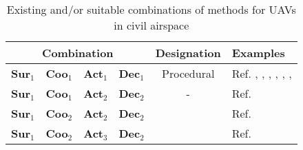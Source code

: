 \begin{table}[h]
 \begin{center}
   \caption{Existing and/or suitable combinations of methods for UAVs in civil airspace }
   \begin{tabular}{lccccl}
   \hline  \multicolumn{4}{c}{Combination} &  Designation & Examples  \\ \hline \hline%
        \textbf{Sur}$_1$ & \textbf{Coo}$_1$ & \textbf{Act}$_1$  & \textbf{Dec}$_1$ & Procedural & Ref. \cite{Yang:02}\tnote{\dag}, \cite{Beard:02}, \cite{Nikolos:03}\tnote{\dag}, \cite{Kaminer:06},  \cite{Borrelli:06}, \cite{Duan:09}\tnote{\dag}, \cite{Cummings:10} \tnote{\dag}\\
        \textbf{Sur}$_1$ & \textbf{Coo}$_1$ & \textbf{Act}$_2$  & \textbf{Dec}$_2$ & - & Ref.~\cite{Huang:14}\tnote{\ddag}\\
        \textbf{Sur}$_1$ & \textbf{Coo}$_2$ & \textbf{Act}$_2$  & \textbf{Dec}$_2$ & & Ref. \cite{Liu:14}\tnote{\ddag} \\
        \textbf{Sur}$_1$ & \textbf{Coo}$_2$ & \textbf{Act}$_3$  & \textbf{Dec}$_2$ & & Ref. \cite{Ding:12} \\

\end{tabular}
\end{center}
\end{table}
